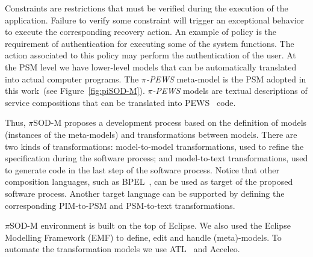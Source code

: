 \documentclass{llncs}
\theoremstyle{plain}
\theoremstyle{plain}
\theoremstyle{plain}
\begin{document}
Constraints are restrictions that must be verified during the execution of the application. 
Failure to verify some constraint will trigger an exceptional behavior to execute the corresponding recovery action.
An example of policy is the requirement of authentication for executing some of the system functions. 
The action associated to this policy may perform the authentication of the user.
%
At the PSM level we have lower-level models that can be automatically translated into actual computer programs.
The \textit{$\pi$-PEWS} meta-model is the PSM adopted in this work~(see Figure~\ref{fig:piSOD-M}).
\textit{$\pi$-PEWS} models are textual descriptions of service compositions that can be translated into PEWS~\cite{BHM06} %
code.





%
Thus, $\pi$SOD-M proposes a development process based on the definition of models
(instances of the meta-models) and transformations between models.
There are two kinds of transformations:
model-to-model transformations, used to refine the specification during the software process; and
model-to-text transformations, used   to generate code in the last step of the software process.
Notice that other composition languages, such as BPEL~\cite{bpel03}, can be used as target of the proposed software process. Another target language can be supported by defining the corresponding PIM-to-PSM and PSM-to-text transformations.



$\pi$SOD-M environment is built on the top of Eclipse. 
We also used the Eclipse Modelling Framework (EMF) to define, edit and handle
(meta)-models. 
To automate the transformation models we use ATL~\cite{atl_manual} and Acceleo.
\end{document}
